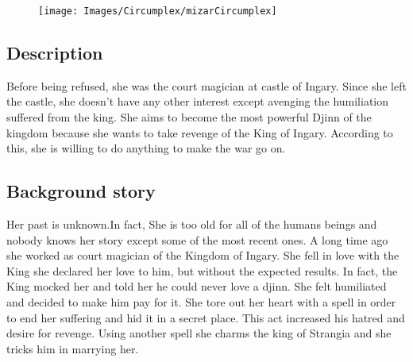 \begin{figure}
    \centering
  \vspace*{5\baselineskip}
  \texttt{[image: Images/Circumplex/mizarCircumplex]}
  \end{figure}

\subsection{Description}
Before being refused, she was the court magician at castle of Ingary. Since she left the castle, she doesn't have any other interest except avenging the humiliation suffered from the king.
She aims to become the most powerful Djinn of the kingdom because she wants to take revenge of the King of Ingary. According to this, she is willing to do anything to make the war go on.

\subsection{Background story}
Her past is unknown.In fact, She is too old for all of the humans beings and nobody knows her story except some of the most recent ones. A long time ago she worked as court magician of the Kingdom of Ingary. She fell in love with the King she declared her love to him, but without the expected results. In fact, the King mocked her and told her he could never love a djinn. She felt humiliated and decided to make him pay for it. She tore out her heart with a spell in order to end her suffering and hid it in a secret place. This act increased his hatred and desire for revenge. Using another spell she charms the king of Strangia and she tricks him in marrying her.



